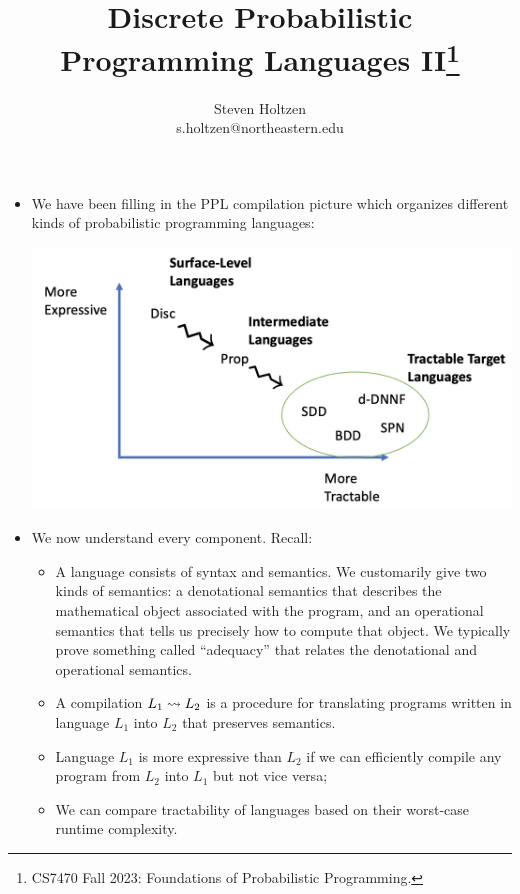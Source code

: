 \documentclass{tufte-handout}
\title{Discrete Probabilistic Programming Languages II\thanks{CS7470 Fall 2023: Foundations of Probabilistic Programming.}}
\author[]{Steven Holtzen\\s.holtzen@northeastern.edu}
\begin{document}
\maketitle%

\begin{itemize}
  \item We have been filling in the PPL compilation picture which organizes 
  different kinds of probabilistic programming languages:

  \includegraphics{motiv.png}

  \item We now understand every component. Recall:
  \begin{itemize}
    \item A language consists of syntax and semantics. We customarily give two 
    kinds of semantics: a denotational semantics that describes the mathematical 
    object associated with the program, and an operational semantics that tells
    us precisely how to compute that object. We typically prove something called
    ``adequacy'' that relates the denotational and operational semantics.
    \item A compilation $L_1 \rightsquigarrow L_2$ is a procedure for translating programs 
    written in language $L_1$ into $L_2$ that preserves semantics.
    \item Language $L_1$ is more expressive than $L_2$ if we can efficiently 
    compile any program from $L_2$ into $L_1$ but not vice versa;
    \item We can compare tractability of languages based on their worst-case
    runtime complexity.
  \end{itemize}


\end{itemize}
\end{document}
